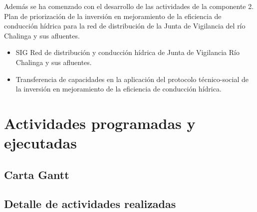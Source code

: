 \documentclass[]{article}
\begin{document}
Además se ha comenzado con el desarrollo de las actividades de la componente 2. Plan de priorización de la inversión en mejoramiento de la eficiencia de conducción hídrica para la red de distribución de la Junta de Vigilancia del río Chalinga y sus afluentes.

\begin{itemize}
\item SIG Red de distribución y conducción hídrica de Junta de Vigilancia Río Chalinga y sus afluentes.
\item Transferencia de capacidades en la aplicación del protocolo técnico-social de la inversión en mejoramiento de la eficiencia de conducción hídrica.
\end{itemize}

\clearpage
\section{Actividades programadas y ejecutadas}

\subsection{Carta Gantt}

\clearpage
\subsection{Detalle de actividades realizadas}
\end{document}
